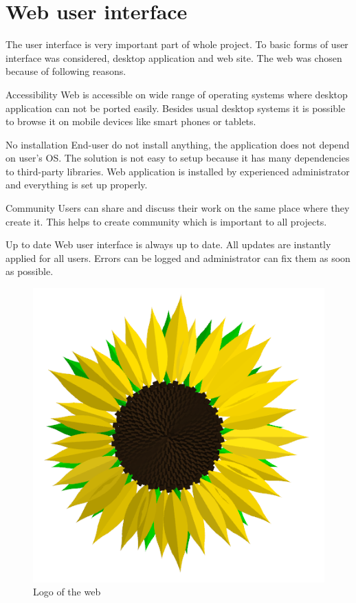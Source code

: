 
\section{Web user interface}

The user interface is very important part of whole project.
To basic forms of user interface was considered, desktop application and web site.
The web was chosen because of following reasons.

\begin{description*}
	\item[Accessibility]
		Web is accessible on wide range of operating systems where desktop application can not be ported easily.
		Besides usual desktop systems it is possible to browse it on mobile devices like smart phones or tablets.		
	\item[No installation]
		End-user do not install anything, the application does not depend on user's OS.
		The solution is not easy to setup because it has many dependencies to third-party libraries.
		Web application is installed by experienced administrator and everything is set up properly.
	\item[Community]
		Users can share and discuss their work on the same place where they create it.
		This helps to create community which is important to all projects.
	\item[Up to date]
		Web user interface is always up to date.
		All updates are instantly applied for all users.
		Errors can be logged and administrator can fix them as soon as possible.		
\end{description*}

\begin{figure}
	\vspace{-20pt}
	\includegraphics[width=\linewidth]{Sunflower}
	\caption{Logo of the web}
	\label{fig:logo}
	\vspace{-20pt}
\end{figure}

